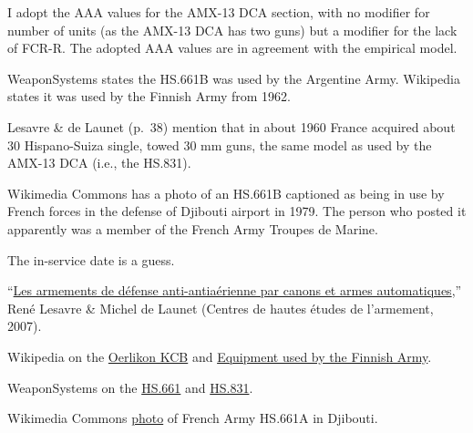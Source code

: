 \begin{withcounters}
{        

        

        I adopt the AAA values for the AMX-13 DCA section, with no modifier for number of units (as the AMX-13 DCA has two guns) but a  modifier for the lack of FCR-R.
        The adopted AAA values are in agreement with the empirical model.

        WeaponSystems states the HS.661B was used by the Argentine Army. Wikipedia states it was used by the Finnish Army from 1962.

        Lesavre \& de Launet (p.~38) mention that in about 1960 France acquired about 30 Hispano-Suiza single, towed 30 mm guns, the same model as used by the AMX-13 DCA (i.e., the HS.831).

        Wikimedia Commons has a photo of an HS.661B captioned as being in use by French forces in the defense of Djibouti airport in 1979. The person who posted it apparently was a member of the French Army Troupes de Marine.

        The in-service date is a guess.

        \begin{notesources}
            \item “\href{https://www.yumpu.com/fr/document/view/16630048/les-armements-de-defense-antiaerienne-souvenirs-de-la-}{\foreignlanguage{french}{Les armements de défense anti-antiaérienne par canons et armes automatiques}},” René Lesavre \& Michel de Launet (\foreignlanguage{french}{Centres de hautes études de l'armement}, 2007).
            \item Wikipedia on the \href{https://en.wikipedia.org/wiki/Oerlikon_KCB}{Oerlikon KCB} and \href{https://en.wikipedia.org/wiki/List_of_former_equipment_of_the_Finnish_Army\#Anti-aircraft_weapons}{Equipment used by the Finnish Army}.
            \item WeaponSystems on the \href{https://weaponsystems.net/system/1561-30mm\%20HS.661}{HS.661} and \href{https://weaponsystems.net/system/1562-30mm\%20Hispano-Suiza\%20HS.831}{HS.831}.
            \item Wikimedia Commons \href{https://commons.wikimedia.org/wiki/File:Monotube_de_30mm_HSS_en_protection_de_l\%27aéroport_de_Djibouti.jpg}{photo} of French Army HS.661A in Djibouti.
        \end{notesources}

    }



\end{withcounters}
